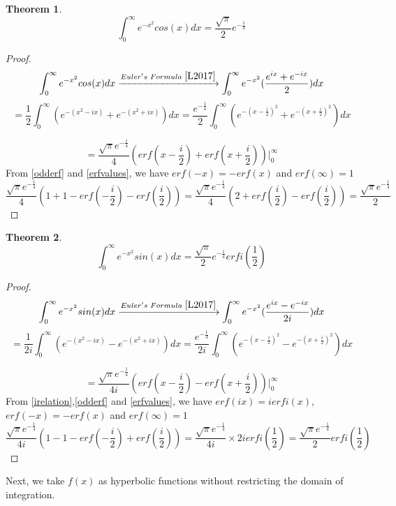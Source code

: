 \documentclass[a4paper,twoside,10pt]{article}
\newtheorem{theorem}{Theorem}[section]
\begin{document}
 \begin{theorem}
\begin{equation}
 \int_0^{\infty} e^{-x^2} cos(x) dx = \frac{\sqrt{\pi}}{2} e^{-\frac{1}{4}}     
\end{equation}
\end{theorem}
\begin{proof}
 \[ \int_0^{\infty} e^{-x^2} cos(x) dx \xrightarrow{ Euler's\,\, Formula \,\, \cite{L2017}}  \int_0^{\infty} e^{-x^2}(\frac{e^{ix}+e^{-ix}}{2}) dx  \]
 \[=\frac{1}{2} \int_0^{ \infty} \left( e^{-(x^2-ix)}+ e^{-(x^2+ix)} \right) dx = \frac{e^{-\frac{1}{4}}}{2} \int_0^{ \infty} \left( e^{-(x-\frac{i}{2})^2}+ e^{-(x+\frac{i}{2})^2} \right) dx \]

\[ =\frac{\sqrt{\pi}e^{-\frac{1}{4}}}{4}  \left( erf(x-\frac{i}{2}) + erf(x+\frac{i}{2}) \right) \Big|_0^{\infty} \] 
From \eqref{odderf} and   \eqref{erfvalues}, we have $erf(-x) = -erf(x)$  and     $erf(\infty)  = 1$ 
 \[\frac{\sqrt{\pi} e^{-\frac{1}{4}} }{4}  \left( 1+ 1 - erf(-\frac{i}{2})-erf(\frac{i}{2}) \right) = \frac{\sqrt{\pi} e^{-\frac{1}{4}} }{4}  \left( 2 + erf(\frac{i}{2})-erf(\frac{i}{2}) \right) = \frac{\sqrt{\pi} e^{-\frac{1}{4}} }{2}   \]
\end{proof}
 \begin{theorem}
\begin{equation}
 \int_0^{\infty} e^{-x^2} sin(x) dx = \frac{\sqrt{\pi}}{2} e^{-\frac{1}{4}} erfi(\frac{1}{2})    
\end{equation}
\end{theorem}
\begin{proof}
 \[ \int_0^{\infty} e^{-x^2} sin(x) dx \xrightarrow{ Euler's\,\, Formula\,\, \cite{L2017}}  \int_0^{\infty} e^{-x^2}(\frac{e^{ix}-e^{-ix}}{2i}) dx  \]
 \[=\frac{1}{2i} \int_0^{ \infty} \left( e^{-(x^2-ix)}- e^{-(x^2+ix)} \right) dx = \frac{e^{-\frac{1}{4}}}{2i} \int_0^{ \infty} \left( e^{-(x-\frac{i}{2})^2}- e^{-(x+\frac{i}{2})^2} \right) dx \]

\[ =\frac{\sqrt{\pi}e^{-\frac{1}{4}}}{4i}  \left( erf(x-\frac{i}{2}) - erf(x+\frac{i}{2}) \right) \Big|_0^{\infty} \] 
From \eqref{irelation},\eqref{odderf} and   \eqref{erfvalues}, we have $erf(ix) = ierfi(x)$, $erf(-x) = -erf(x)$ and $erf(\infty) = 1 $ 
 \[\frac{\sqrt{\pi} e^{-\frac{1}{4}} }{4i}  \left( 1- 1 - erf(-\frac{i}{2})+erf(\frac{i}{2}) \right) = \frac{\sqrt{\pi} e^{-\frac{1}{4}} }{4i}\times 2 ierfi(\frac{1}{2}) = \frac{\sqrt{\pi} e^{-\frac{1}{4}} }{2} erfi(\frac{1}{2})   \]
\end{proof}
 Next, we take $f(x)$ as hyperbolic functions without restricting the domain of integration. 
 
\end{document}
